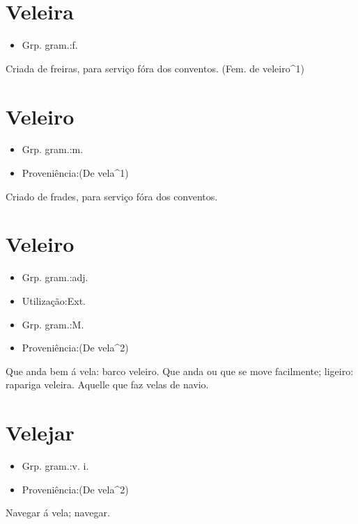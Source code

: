 \documentclass{article}
\begin{document}
\section{Veleira}
\begin{itemize}
\item {Grp. gram.:f.}
\end{itemize}
Criada de freiras, para serviço fóra dos conventos.
(Fem. de \textunderscore veleiro\textunderscore ^1)
\section{Veleiro}
\begin{itemize}
\item {Grp. gram.:m.}
\end{itemize}
\begin{itemize}
\item {Proveniência:(De \textunderscore vela\textunderscore  ^1)}
\end{itemize}
Criado de frades, para serviço fóra dos conventos.
\section{Veleiro}
\begin{itemize}
\item {Grp. gram.:adj.}
\end{itemize}
\begin{itemize}
\item {Utilização:Ext.}
\end{itemize}
\begin{itemize}
\item {Grp. gram.:M.}
\end{itemize}
\begin{itemize}
\item {Proveniência:(De \textunderscore vela\textunderscore ^2)}
\end{itemize}
Que anda bem á vela: \textunderscore barco veleiro\textunderscore .
Que anda ou que se move facilmente; ligeiro: \textunderscore rapariga veleira\textunderscore .
Aquelle que faz velas de navio.
\section{Velejar}
\begin{itemize}
\item {Grp. gram.:v. i.}
\end{itemize}
\begin{itemize}
\item {Proveniência:(De \textunderscore vela\textunderscore ^2)}
\end{itemize}
Navegar á vela; navegar.
\end{document}
